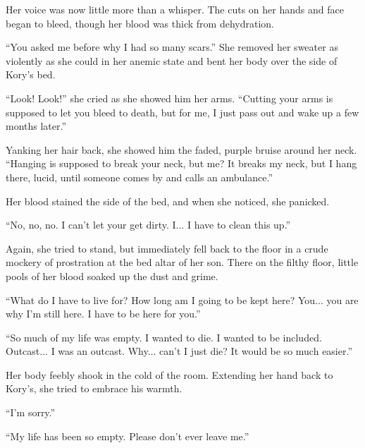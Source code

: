 Her voice was now little more than a whisper. The cuts on her hands and face began to bleed, though her blood was thick from dehydration.

``You asked me before why I had so many scars.'' She removed her sweater as violently as she could in her anemic state and bent her body over the side of Kory's bed.

``Look! Look!'' she cried as she showed him her arms. ``Cutting your arms is supposed to let you bleed to death, but for me, I just pass out and wake up a few months later.''

Yanking her hair back, she showed him the faded, purple bruise around her neck. ``Hanging is supposed to break your neck, but me? It breaks my neck, but I hang there, lucid, until someone comes by and calls an ambulance.''

Her blood stained the side of the bed, and when she noticed, she panicked.

``No, no, no. I can't let your get dirty. I... I have to clean this up.''

Again, she tried to stand, but immediately fell back to the floor in a crude mockery of prostration at the bed altar of her son. There on the filthy floor, little pools of her blood soaked up the dust and grime.

``What do I have to live for? How long am I going to be kept here? You... you are why I'm still here. I have to be here for you.''

``So much of my life was empty. I wanted to die. I wanted to be included. Outcast... I was an outcast. Why... can't I just die? It would be so much easier.''

Her body feebly shook in the cold of the room. Extending her hand back to Kory's, she tried to embrace his warmth.

``I'm sorry.''

``My life has been so empty. Please don't ever leave me.''

\line


